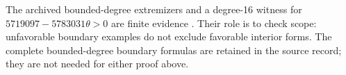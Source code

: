 The archived bounded-degree extremizers and a degree-16 witness for
$5719097-5783031\theta>0$ are finite evidence
. Their role is to check scope: unfavorable boundary
examples do not exclude favorable interior forms. The complete
bounded-degree boundary formulas are retained in the source record;
they are not needed for either proof above.
